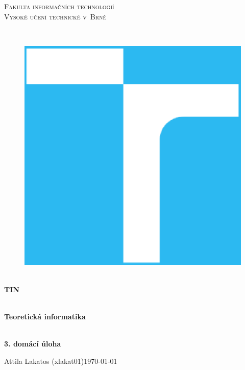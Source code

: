 \documentclass[11pt,a4paper]{article}
\begin{document}
\begin{titlepage}

    \begin{center}
        \vfill {%
            \Huge{%
                \textsc{%
                    Fakulta informačních technologií\\[3mm]%
                    Vysoké učení technické v~Brně%
                }%
            }%
        }%

        \hfill\\[15mm]

        \begin{figure}[!h]
            \centering
            \includegraphics[scale=0.3]{vutbr-fit-logo.eps}
        \end{figure}

        \hfill\\[10mm]

        \Huge{
            \textbf{
                TIN
            }
        }

        \hfill\\[-10mm]

        \huge{
            \textbf{
                Teoretická informatika
            }
        }

        \hfill\\[10mm]

        \LARGE{
            \textbf{
                3. domácí úloha
            }
        }
        \vfill

    \end{center}

        \Large{
            Attila Lakatos (xlakat01)\hfill \today
        }

\end{titlepage}
\end{document}
